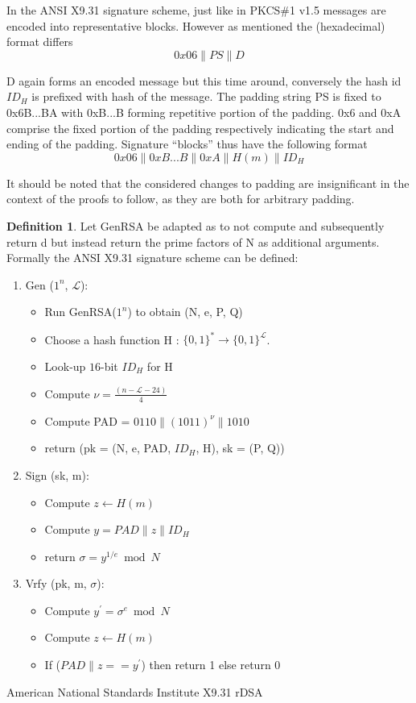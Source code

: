 \documentclass[]{final_report}
\theoremstyle{definition}
\newtheorem{definition}{Definition}[chapter]
\begin{document}
In the ANSI X9.31 signature scheme,  just like in PKCS\#1 v1.5 messages are encoded into representative blocks. However as mentioned the (hexadecimal) format differs
\[0x06\|PS\|D\]

D again forms an encoded message but this time around, conversely the hash id $ID_{H}$ is prefixed with hash of the message.  The padding string PS is fixed to 0x6B...BA with 0xB...B forming repetitive portion of the padding. 0x6 and 0xA comprise the fixed  portion of the padding respectively indicating the start and ending of the padding. 
Signature “blocks” thus have the following format
\[0x06\|0xB . . . B\|0xA\|H(m)\|ID_{H}\]

It should be noted that the considered changes to padding are insignificant in the context of the proofs to follow, as they are both for arbitrary padding.


\begin{definition}
Let GenRSA be adapted as to not compute and subsequently return d but instead return the prime factors of N as additional arguments. Formally the ANSI X9.31 signature scheme can be defined:
\begin{enumerate}
    \item Gen ($1^n$, $\mathcal{L}$): 
    \begin{itemize}
    \item[] Run GenRSA($1^n$) to obtain (N, e, P, Q)
    \item[] Choose a hash function H : $\{0, 1\}^* \rightarrow \{0, 1\}^\mathcal{L}$.
    \item[] Look-up $16$-bit $ID_{H}$ for H
    \item[] Compute $\nu = \frac{(n - \mathcal{L} - 24)}{4} $
    \item[] Compute PAD = $0110 \| (1011)^{\nu} \| 1010$
    \item[] return (pk = (N, e, PAD, $ID_{H}$, H), sk = (P, Q))
    \end{itemize}

    \item Sign (sk, m):
    \begin{itemize}
    \item[] Compute $z \leftarrow H(m)$
    \item[] Compute $y = PAD  \| z \| ID_{H}$
    \item[] return $\sigma = y^{1/e} \bmod N$
    \end{itemize}
   
    \item Vrfy (pk, m, $\sigma$):  
    \begin{itemize}
    \item[] Compute $y^{'} = \sigma^{e} \bmod N$
    \item[] Compute $z \leftarrow H(m)$
    \item[] If ($PAD \| z == y^{'}$) then return 1 else return 0
    \end{itemize}
\end{enumerate}
American National Standards Institute X9.31 rDSA
\end{definition}
\end{document}
